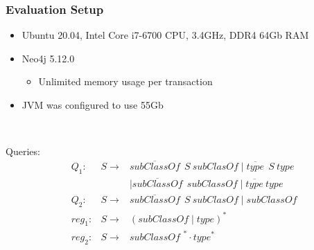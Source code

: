 \documentclass[xcolor=table,aspectratio=169]{beamer}
\begin{document}
\begin{frame}[fragile] \frametitle{Evaluation Setup}

\begin{minipage}[t]{0.51\textwidth}
\vspace{-1.4cm}
\begin{itemize}
  \item Ubuntu 20.04, Intel Core i7-6700 CPU, 3.4GHz, DDR4 64Gb RAM
  \item Neo4j 5.12.0
  \begin{itemize}
    \item Unlimited memory usage per transaction
  \end{itemize}
  \item JVM was configured to use 55Gb  
\end{itemize}

\end{minipage}
~
\begin{minipage}[t]{0.44\textwidth}
{
}
\end{minipage}

Queries:
\begin{align*}
&Q_1: & S \to & \overline{\textit{subClassOf}} \ \ S \ \textit{subClasOf} \mid \overline{\textit{type}} \ \ S \ \textit{type} \\ 
&     &       & \mid \overline{\textit{subClassOf}} \ \ \textit{subClassOf} \mid \overline{\textit{type}} \ \textit{type} \\
&Q_2: & S  \to & \overline{\textit{subClassOf}} \ \ S \ \textit{subClasOf} \mid \textit{subClassOf} \\
&\textit{reg}_1:& S  \to  & (\textit{subClassOf} \mid \textit{type})^* \\
&\textit{reg}_2:& S  \to  & \textit{subClassOf }^* \cdot \textit{type}^*
\end{align*}

\end{frame}
\end{document}
